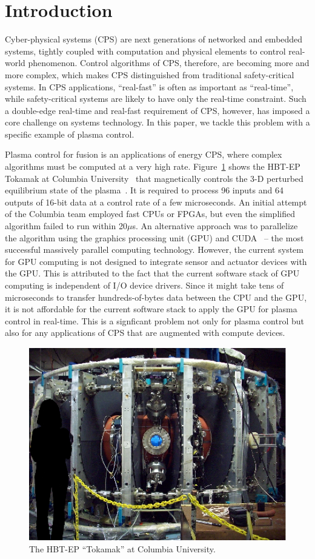 \section{Introduction}
\label{sec:introduction}

Cyber-physical systems (CPS) are next generations of networked and
embedded systems, tightly coupled with computation and physical
elements to control real-world phenomenon.
Control algorithms of CPS, therefore, are becoming more and more
complex, which makes CPS distinguished from traditional safety-critical
systems.
In CPS applications, ``real-fast'' is often as important as ``real-time'',
while safety-critical systems are likely to have only the real-time
constraint. 
Such a double-edge real-time and real-fast requirement of CPS, however,
has imposed a core challenge on systems technology.
In this paper, we tackle this problem with a specific example of plasma
control.

Plasma control for fusion is an applications of energy CPS, where
complex algorithms must be computed at a very high rate.
Figure~\ref{fig:tokamak} shows the HBT-EP Tokamak at Columbia
University~\cite{Maurer_PPCF11,Rath_FED12} that magnetically controls
the 3-D perturbed equilibrium state of the plasma~\cite{Boozer_PP99}.
It is required to process 96 inputs and 64 outputs of 16-bit data at a
control rate of a few microseconds.
An initial attempt of the Columbia team employed fast CPUs or FPGAs, but
even the simplified algorithm failed to run within 20$\mu$s.
An alternative approach was to parallelize the algorithm using the
graphics processing unit (GPU) and CUDA~\cite{CUDA} -- the most
successful massively parallel computing technology.
However, the current system for GPU computing is not designed to
integrate sensor and actuator devices with the GPU.
This is attributed to the fact that the current software stack
of GPU computing is independent of I/O device drivers.
Since it might take tens of microseconds to transfer hundreds-of-bytes
data between the CPU and the GPU, it is not affordable for the current
software stack to apply the GPU for plasma control in real-time.
This is a signficant problem not only for plasma control but also for
any applications of CPS that are augmented with compute devices.

\begin{figure}[t]
 \centering
 \includegraphics[width=0.78\hsize]{eps/tokamak.eps}
 \caption{The HBT-EP ``Tokamak'' at Columbia University.}
 \label{fig:tokamak}
\end{figure}

